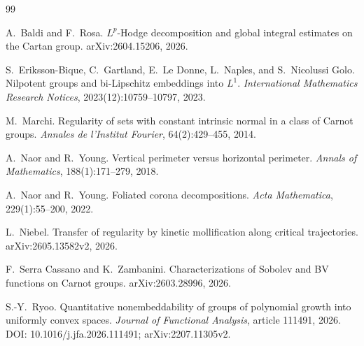 \documentclass[11pt]{article}
\theoremstyle{definition}
\theoremstyle{remark}
\begin{document}
\begin{thebibliography}{99}

A.~Baldi and F.~Rosa.
\newblock \(L^p\)-Hodge decomposition and global integral estimates on the Cartan group.
\newblock arXiv:2604.15206, 2026.

S.~Eriksson-Bique, C.~Gartland, E.~Le Donne, L.~Naples, and S.~Nicolussi Golo.
\newblock Nilpotent groups and bi-Lipschitz embeddings into \(L^1\).
\newblock \emph{International Mathematics Research Notices}, 2023(12):10759--10797, 2023.

M.~Marchi.
\newblock Regularity of sets with constant intrinsic normal in a class of Carnot groups.
\newblock \emph{Annales de l'Institut Fourier}, 64(2):429--455, 2014.

A.~Naor and R.~Young.
\newblock Vertical perimeter versus horizontal perimeter.
\newblock \emph{Annals of Mathematics}, 188(1):171--279, 2018.

A.~Naor and R.~Young.
\newblock Foliated corona decompositions.
\newblock \emph{Acta Mathematica}, 229(1):55--200, 2022.

L.~Niebel.
\newblock Transfer of regularity by kinetic mollification along critical trajectories.
\newblock arXiv:2605.13582v2, 2026.

F.~Serra Cassano and K.~Zambanini.
\newblock Characterizations of Sobolev and BV functions on Carnot groups.
\newblock arXiv:2603.28996, 2026.

S.-Y.~Ryoo.
\newblock Quantitative nonembeddability of groups of polynomial growth into uniformly convex spaces.
\newblock \emph{Journal of Functional Analysis}, article 111491, 2026.
\newblock DOI: 10.1016/j.jfa.2026.111491; arXiv:2207.11305v2.

\end{thebibliography}
\end{document}
